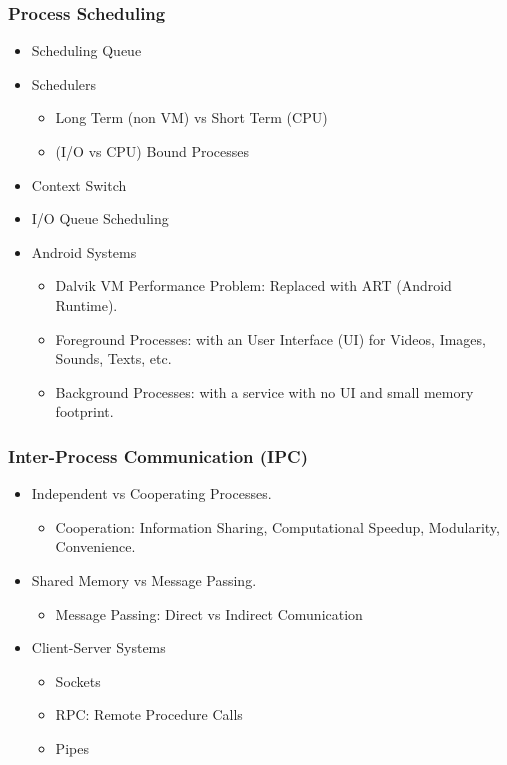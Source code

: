 \documentclass[aspectratio=169, xcolor=table, notheorems, hyperref={pdfpagelabels=false}]{beamer}
\begin{document}
\begin{frame}
\frametitle{Process Scheduling}
\begin{itemize}
\item Scheduling Queue
\item Schedulers
\begin{itemize}
\item Long Term (non VM) vs Short Term (CPU)
\item (I/O vs CPU) Bound Processes
\end{itemize}
\item Context Switch
\item I/O Queue Scheduling
\item Android Systems
\begin{itemize}
\item Dalvik VM Performance Problem: Replaced with ART (Android Runtime).
\item Foreground Processes: with an User Interface (UI) for Videos, Images, Sounds, Texts, etc.
\item Background Processes: with a service with no UI and small memory footprint.
\end{itemize}
\end{itemize}
\end{frame}

\begin{frame}
\frametitle{Inter-Process Communication (IPC)}
\begin{itemize}
\item Independent vs Cooperating Processes.
\begin{itemize}
\item Cooperation: Information Sharing, Computational Speedup, Modularity, Convenience.
\end{itemize}
\item Shared Memory vs Message Passing.
\begin{itemize}
\item Message Passing: Direct vs Indirect Comunication
\end{itemize}
\item Client-Server Systems
\begin{itemize}
\item Sockets
\item RPC: Remote Procedure Calls
\item Pipes
\end{itemize}
\end{itemize}
\end{frame}
\end{document}
